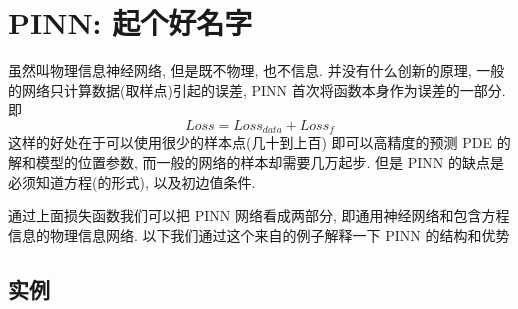 \section{PINN: 起个好名字}
虽然叫物理信息神经网络, 但是既不物理, 也不信息. 并没有什么创新的原理, 一般的网络只计算数据(取样点)引起的误差, PINN 首次将函数本身作为误差的一部分. 即
\begin{equation}
    Loss = Loss_{data} + Loss_{f}
\end{equation}
这样的好处在于可以使用很少的样本点(几十到上百) 即可以高精度的预测 PDE 的解和模型的位置参数, 而一般的网络的样本却需要几万起步. 但是 PINN 的缺点是必须知道方程(的形式), 以及初边值条件. 

通过上面损失函数我们可以把 PINN 网络看成两部分, 即通用神经网络和包含方程信息的物理信息网络. 以下我们通过这个来自\cite{PINN}的例子解释一下 PINN 的结构和优势
\subsection{实例}
